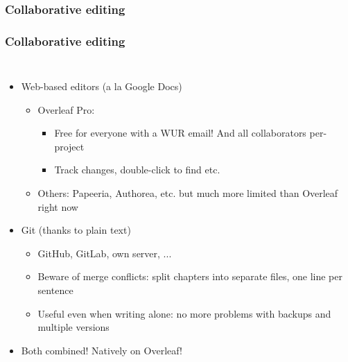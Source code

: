 \documentclass[colorlinks]{beamer} %
\begin{document}
  \subsubsection{Collaborative editing}
  \begin{frame}
    \frametitle{Collaborative editing}
    \begin{columns}
      \begin{itemize}
	\item Web-based editors (a la Google Docs)
	\begin{itemize}
	  \item Overleaf Pro:
	  \begin{itemize}
	    \item Free for everyone with a WUR email! And all collaborators per-project
	    \item Track changes, double-click to find etc.
	  \end{itemize}
	  \item Others: Papeeria, Authorea, etc. but much more limited than Overleaf right now
	\end{itemize}
	\item Git (thanks to plain text)
	\begin{itemize}
	  \item GitHub, GitLab, own server, ...
	  \item Beware of merge conflicts: split chapters into separate files, one line per sentence
	  \item Useful even when writing alone: no more problems with backups and multiple versions
	\end{itemize}
	\item Both combined! Natively on Overleaf!
      \end{itemize}
      
    \end{columns}
  \end{frame}
  
\end{document}
